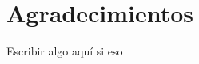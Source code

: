 \ifspanish
\else
\fi

%
%
\cleardoublepage
{} %

\chapter*{Agradecimientos} %

Escribir algo aquí si eso

\makeatletter		
\begin{flushright}
	\textit{\@autor}
\end{flushright}
\makeatother